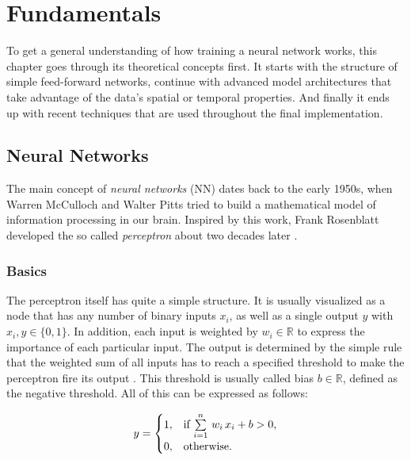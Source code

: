 

\chapter{Fundamentals} \label{chapter:fundamentals}

To get a general understanding of how training a neural network works, this chapter goes through its theoretical concepts first. It starts with the structure of simple feed-forward networks, continue with advanced model architectures that take advantage of the data's spatial or temporal properties. And finally it ends up with recent techniques that are used throughout the final implementation.


\section{Neural Networks}

The main concept of \textit{neural networks} (NN) dates back to the early 1950s, when Warren McCulloch and Walter Pitts tried to build a mathematical model of information processing in our brain. Inspired by this work, Frank Rosenblatt developed the so called \textit{perceptron} about two decades later \parencite[p. 226]{pattern_and_ml}. 

\subsection{Basics}

The perceptron itself has quite a simple structure. It is usually visualized as a node that has any number of binary inputs $ x_{i} $, as well as a single output $ y $ with $ x_{i}, y \in \{0, 1\} $. In addition, each input is weighted by $ w_{i} \in \mathbb{R} $ to express the importance of each particular input. The output is determined by the simple rule that the weighted sum of all inputs has to reach a specified threshold to make the perceptron fire its output \parencite{neural_nets_deep_learning}. This threshold is usually called bias $ b \in \mathbb{R} $, defined as the negative threshold. All of this can be expressed as follows:

\begin{equation} \label{eq:mlp}
  y = \begin{cases}
    1, & \text{if $ \sum\limits_{i=1}^n \, w_{i} \, x_{i} + b > 0$},\\
    0, & \text{otherwise}.
  \end{cases}
\end{equation}

